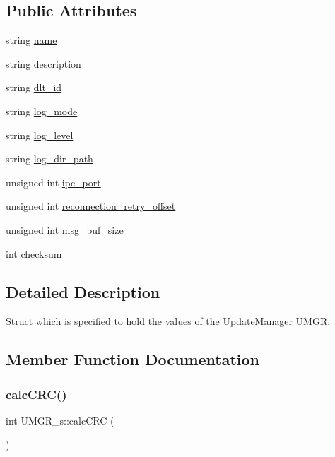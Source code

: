 \subsection*{Public Attributes}
\begin{DoxyCompactItemize}
\item 
string \hyperlink{structUMGR__s_a3d36ca5f936e211da7645b00894c68dd}{name}
\item 
string \hyperlink{structUMGR__s_a80540aaa70f1333ba3c558f6af7a39a1}{description}
\item 
string \hyperlink{structUMGR__s_a0a329d092b37dd9061136642d6bebd15}{dlt\+\_\+id}
\item 
string \hyperlink{structUMGR__s_ab9ebb2767a511f0e791ae1f07b2a03e2}{log\+\_\+mode}
\item 
string \hyperlink{structUMGR__s_a59eaa08e65bbab14ab1deb4969a261c3}{log\+\_\+level}
\item 
string \hyperlink{structUMGR__s_ae8d842a1050f74d35c2785f9d72f7197}{log\+\_\+dir\+\_\+path}
\item 
unsigned int \hyperlink{structUMGR__s_a9024c1140605de70cf368de635024702}{ipc\+\_\+port}
\item 
unsigned int \hyperlink{structUMGR__s_af846433f5bfd716a224c3cf7ac208fdb}{reconnection\+\_\+retry\+\_\+offset}
\item 
unsigned int \hyperlink{structUMGR__s_aa3ce6d48e8db2d85e084d079548b8338}{msg\+\_\+buf\+\_\+size}
\item 
int \hyperlink{structUMGR__s_a3a98cb14c2b8c9545aa47871865076e6}{checksum}
\end{DoxyCompactItemize}


\subsection{Detailed Description}
Struct which is specified to hold the values of the Update\+Manager U\+M\+GR. 

\subsection{Member Function Documentation}
\mbox{\label{structUMGR__s_ae71a2770c3e37f1d859374359f99aae6}} 
\subsubsection{\texorpdfstring{calc\+C\+R\+C()}{calcCRC()}}
{\footnotesize\ttfamily int U\+M\+G\+R\+\_\+s\+::calc\+C\+RC (\begin{DoxyParamCaption}{ }\end{DoxyParamCaption})\hspace{0.3cm}{\ttfamily [inline]}}



